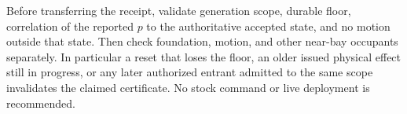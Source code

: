 \documentclass{article}
\begin{document}
Before transferring the receipt, validate generation scope, durable floor, correlation of the reported $p$ to the authoritative accepted state, and no motion outside that state. Then check foundation, motion, and other near-bay occupants separately. In particular a reset that loses the floor, an older issued physical effect still in progress, or any later authorized entrant admitted to the same scope invalidates the claimed certificate. No stock command or live deployment is recommended.
\end{document}
